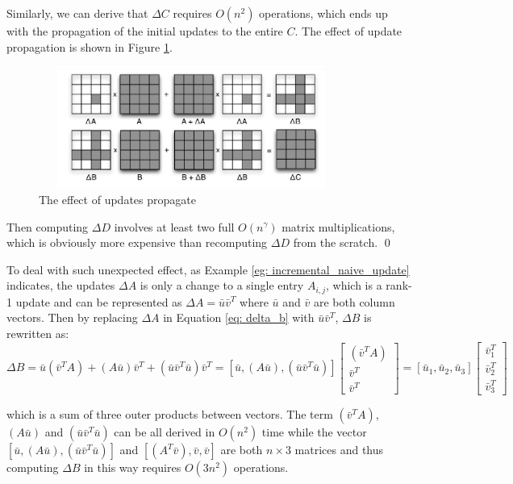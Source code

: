\begin{example}
Similarly, we can derive that $\Delta C$ requires $O(n^2)$ operations, which ends up with the propagation of the initial updates to the entire $C$. The effect of update propagation is shown in Figure \ref{fig:update_propagete}.

\begin{figure}
    \centering
    \includegraphics[width=10cm, height=4cm]{Figures/update_propagation.png}
    \caption{The effect of updates propagate}
    \label{fig:update_propagete}
\end{figure}

Then computing $\Delta D$ involves at least two full $O(n^{\gamma})$ matrix multiplications, which is obviously more expensive than recomputing $\Delta D$ from the scratch. \qed
\end{example}


To deal with such unexpected effect, as Example \ref{eg: incremental_naive_update} indicates, the updates $\Delta A$ is only a change to a single entry $A_{i,j}$, which is a rank-1 update and can be represented as $\Delta A = \bar{u}\bar{v}^T$ where $\bar{u}$ and $\bar{v}$ are both column vectors. Then by replacing $\Delta A$ in Equation \ref{eq: delta_b} with $\bar{u}\bar{v}^T$, $\Delta B$ is rewritten as:
\begin{equation}\label{eq: update_b_product}
\Delta B = \bar{u}(\bar{v}^TA) + (A\bar{u})\bar{v}^T + (\bar{u}\bar{v}^T\bar{u})\bar{v}^T=[\bar{u}, (A\bar{u}), (\bar{u}\bar{v}^T\bar{u})]
\begin{bmatrix}
    (\bar{v}^TA)  \\
    \bar{v}^T  \\
    \bar{v}^T   
\end{bmatrix}
=[\bar{u}_1, \bar{u}_2, \bar{u}_3]
\begin{bmatrix}
    \bar{v}^T_1  \\
    \bar{v}^T_2  \\
    \bar{v}^T_3  
\end{bmatrix}
\end{equation}

which is a sum of three outer products between vectors. The term $(\bar{v}^TA)$, $(A\bar{u})$ and $(\bar{u}\bar{v}^T\bar{u})$ can be all derived in $O(n^2)$ time while the vector $[\bar{u}, (A\bar{u}), (\bar{u}\bar{v}^T\bar{u})]$ and $[(A^T\bar{v}), \bar{v}, \bar{v}]$ are both $n \times 3$ matrices and thus computing $\Delta B$ in this way requires $O(3n^2)$ operations.

